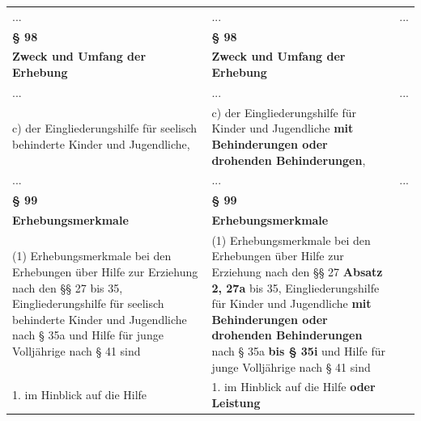 \documentclass[10pt,a4paper,landscape]{article}
\begin{document}
\begin{longtable}{|L{8.2cm}|L{8.2cm}|L{8.2cm}|}
\hhline{|---|}
... & ... & ... \\
\hhline{|---|}
\textbf{\S{} 98} & \textbf{\S{} 98} &  \\
\hhline{|---|}
\textbf{Zweck und Umfang der Erhebung } & \textbf{Zweck und Umfang der Erhebung } &  \\
\hhline{|---|}
... & ... & ... \\
\hhline{|---|}
c)   \newline der Eingliederungshilfe für seelisch  \newline behinderte Kinder und Jugendliche, & c)   \newline der Eingliederungshilfe für Kinder und  \newline Jugendliche \textbf{\textcolor{diffred}{mit Behinderungen oder  \newline drohenden Behinderungen}}, &  \\
\hhline{|---|}
... & ... & ... \\
\hhline{|---|}
\textbf{\S{} 99} & \textbf{\S{} 99} &  \\
\hhline{|---|}
\textbf{Erhebungsmerkmale } & \textbf{Erhebungsmerkmale } &  \\
\hhline{|---|}
(1) Erhebungsmerkmale bei den  \newline Erhebungen über Hilfe zur Erziehung nach  \newline den \S{}\S{} 27 bis 35, Eingliederungshilfe für  \newline seelisch behinderte Kinder und  \newline Jugendliche nach \S{} 35a und Hilfe für junge  \newline Volljährige nach \S{} 41 sind & (1) Erhebungsmerkmale bei den  \newline Erhebungen über Hilfe zur Erziehung nach  \newline den \S{}\S{} 27 \textbf{\textcolor{diffred}{Absatz 2, 27a}} bis 35,  \newline Eingliederungshilfe für Kinder und  \newline Jugendliche \textbf{\textcolor{diffred}{mit Behinderungen oder  \newline drohenden Behinderungen}} nach \S{} 35a  \newline \textbf{\textcolor{diffred}{bis \S{} 35i}} und Hilfe für junge Volljährige  \newline nach \S{} 41 sind &  \\
\hhline{|---|}
1. im Hinblick auf die Hilfe & 1. im Hinblick auf die Hilfe \textbf{\textcolor{diffred}{oder Leistung}} &  \\

\end{longtable}
\end{document}
